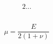 \documentclass{article}
\begin{document}
\begin{alignat}{2}
  ...
\end{alignat}

\begin{equation}\label{eq:elas:C}
\end{equation}

\begin{equation}
  \mu     = \frac{E    }{2(1+\nu)        }
\end{equation}
\end{document}
